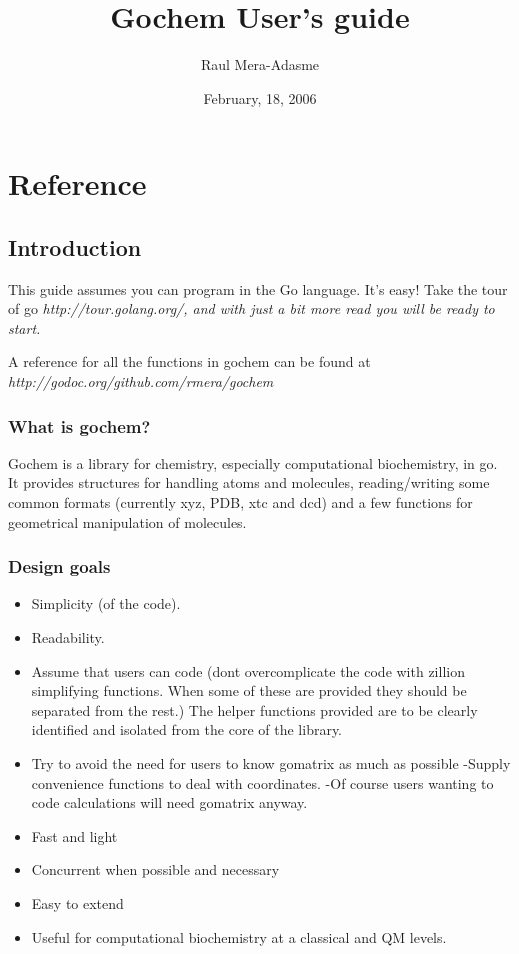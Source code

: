 \documentclass{report}
\title{Gochem User's guide}
\author{Raul Mera-Adasme}
\date{February, 18, 2006}
\begin{document}
\maketitle
\chapter{Reference}
\section{Introduction}
This guide assumes you can program in the Go language. It's easy!
Take the tour of go \it{http://tour.golang.org/}, and with just a bit more read
you will be ready to start.


A reference for all the functions in gochem can be found at
\it{http://godoc.org/github.com/rmera/gochem}

\subsection{What is gochem?}
Gochem is a library for chemistry, especially computational 
biochemistry, in go. It provides structures for handling atoms and 
molecules, reading/writing some common formats (currently xyz, PDB, 
xtc and dcd) and a few functions for geometrical manipulation of 
molecules.


\subsection{Design goals}


\begin{itemize} 
\item Simplicity (of the code).
\item Readability.
\item Assume that users can code (dont overcomplicate the code with 
	zillion simplifying functions. When some of these are provided 
	they should be separated from the rest.) The helper functions 
	provided are to be clearly identified and isolated from the core
	of the library.
\item Try to avoid the need for users to know gomatrix as much as possible
	-Supply convenience functions to deal with coordinates.
	-Of course users wanting to code calculations will need gomatrix 
	anyway.
\item Fast and light
\item Concurrent when possible and necessary
\item Easy to extend
\item Useful for computational biochemistry at a classical and QM levels.

\end{itemize}
\end{document}
